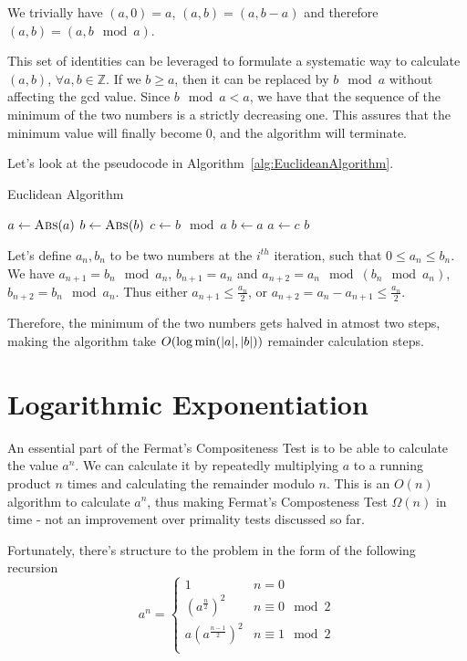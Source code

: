 \documentclass[11pt]{report}
\DeclarePairedDelimiter\abs{\lvert}{\rvert}
\begin{document}
We trivially have $(a,0) = a$, $(a,b) = (a,b-a)$ and therefore $(a,b) = (a,b \mod a)$. 

This set of identities can be leveraged to formulate a systematic way to calculate $(a,b)$, $\forall a, b \in \mathbb{Z}$. If we $b \geq a$, then it can be replaced by $b \mod a$ without affecting the gcd value. Since $b \mod a < a$, we have that the sequence of the minimum of the two numbers is a strictly decreasing one. This assures that the minimum value will finally become $0$, and the algorithm will terminate.

Let's look at the pseudocode in Algorithm~\ref{alg:EuclideanAlgorithm}.

\begin{algorithm}
\caption{Euclidean Algorithm}
\label{alg:EuclideanAlgorithm}
\begin{algorithmic}
\State $a \gets \Call{Abs}{a}$
\State $b \gets \Call{Abs}{b}$ 
	\State {} 
\EndIf
{}
	\State $c \gets b \mod a$
	\State $b \gets a$
	\State $a \gets c$
\EndWhile
\State \Return $b$
\EndProcedure
\end{algorithmic}
\end{algorithm}

Let's define $a_n, b_n$ to be two numbers at the $i^{th}$ iteration, such that $0 \leq a_n \leq b_n$. We have $a_{n+1} = b_n \mod a_n$, $b_{n+1} = a_n$ and $a_{n+2} = a_n \mod (b_n \mod a_n)$, $b_{n+2} = b_n \mod a_n$. Thus either $a_{n+1} \leq \frac {a_n} 2$, or $a_{n+2} = a_n - a_{n+1} \leq \frac {a_n} 2$. 

Therefore, the minimum of the two numbers gets halved in atmost two steps, making the algorithm take $O(\log \min(\abs a,\abs b))$ remainder calculation steps.

\section{Logarithmic Exponentiation}

An essential part of the Fermat's Compositeness Test is to be able to calculate the value $a^n$. We can calculate it by repeatedly multiplying $a$ to a running product $n$ times and calculating the remainder modulo $n$. This is an $O(n)$ algorithm to calculate $a^n$, thus making Fermat's Composteness Test $\Omega(n)$ in time - not an improvement over primality tests discussed so far.

Fortunately, there's structure to the problem in the form of the following recursion
\[a^n = \begin{cases} 
      1 & n = 0 \\
      (a^{\frac n 2})^2 & n \equiv 0 \mod 2 \\
      a(a^{\frac {n-1} 2})^2 & n \equiv 1 \mod 2 \\
   \end{cases}
\]
\end{document}
